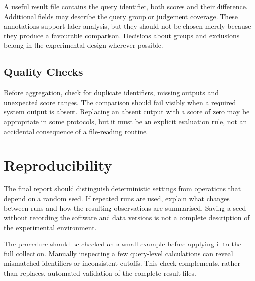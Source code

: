 A useful result file contains the query identifier, both scores and their
difference. Additional fields may describe the query group or judgement
coverage. These annotations support later analysis, but they should not be
chosen merely because they produce a favourable comparison. Decisions about
groups and exclusions belong in the experimental design wherever possible.

\subsection{Quality Checks}
Before aggregation, check for duplicate identifiers, missing outputs and
unexpected score ranges. The comparison should fail visibly when a required
system output is absent. Replacing an absent output with a score of zero may
be appropriate in some protocols, but it must be an explicit evaluation rule,
not an accidental consequence of a file-reading routine.

\section{Reproducibility}
The final report should distinguish deterministic settings from operations
that depend on a random seed. If repeated runs are used, explain what changes
between runs and how the resulting observations are summarised. Saving a seed
without recording the software and data versions is not a complete description
of the experimental environment.

The procedure should be checked on a small example before applying it to the
full collection. Manually inspecting a few query-level calculations can reveal
mismatched identifiers or inconsistent cutoffs. This check complements, rather
than replaces, automated validation of the complete result files.
